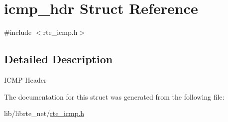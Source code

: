 \hypertarget{structicmp__hdr}{}\section{icmp\+\_\+hdr Struct Reference}
\label{structicmp__hdr}


{\ttfamily \#include $<$rte\+\_\+icmp.\+h$>$}



\subsection{Detailed Description}
I\+C\+M\+P Header 

The documentation for this struct was generated from the following file\+:\begin{DoxyCompactItemize}
\item 
lib/librte\+\_\+net/\hyperlink{rte__icmp_8h}{rte\+\_\+icmp.\+h}\end{DoxyCompactItemize}
